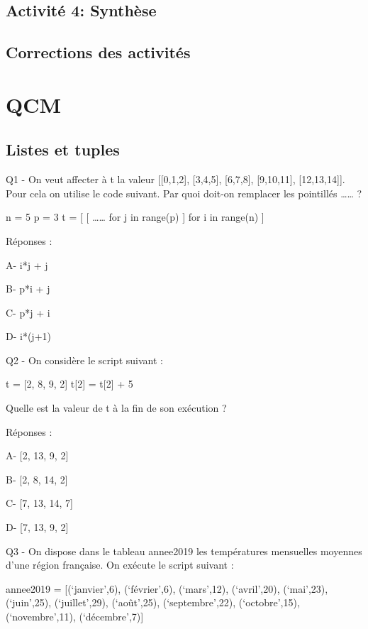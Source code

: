 \documentclass[
]{book}
\begin{document}
\hypertarget{activituxe9-4-synthuxe8se-1}{%
\section{Activité 4: Synthèse}\label{activituxe9-4-synthuxe8se-1}}

\hypertarget{corrections-des-activituxe9s-1}{%
\section{Corrections des activités}\label{corrections-des-activituxe9s-1}}

\hypertarget{qcm}{%
\chapter{QCM}\label{qcm}}

\hypertarget{listes-et-tuples-1}{%
\section{Listes et tuples}\label{listes-et-tuples-1}}

Q1 - On veut affecter à t la valeur {[}{[}0,1,2{]}, {[}3,4,5{]}, {[}6,7,8{]}, {[}9,10,11{]}, {[}12,13,14{]}{]}. Pour cela on utilise le code suivant. Par quoi doit-on remplacer les pointillés \ldots\ldots{} ?

n = 5
p = 3
t = {[} {[} \ldots\ldots{} for j in range(p) {]} for i in range(n) {]}

Réponses :

A- i*j + j

B- p*i + j

C- p*j + i

D- i*(j+1)

Q2 - On considère le script suivant :

t = {[}2, 8, 9, 2{]}
t{[}2{]} = t{[}2{]} + 5

Quelle est la valeur de t à la fin de son exécution ?

Réponses :

A- {[}2, 13, 9, 2{]}

B- {[}2, 8, 14, 2{]}

C- {[}7, 13, 14, 7{]}

D- {[}7, 13, 9, 2{]}

Q3 - On dispose dans le tableau annee2019 les températures mensuelles moyennes d'une région française. On exécute le script suivant :

annee2019 = {[}(`janvier',6), (`février',6), (`mars',12),
(`avril',20), (`mai',23), (`juin',25),
(`juillet',29), (`août',25), (`septembre',22),
(`octobre',15), (`novembre',11), (`décembre',7){]}
\end{document}
